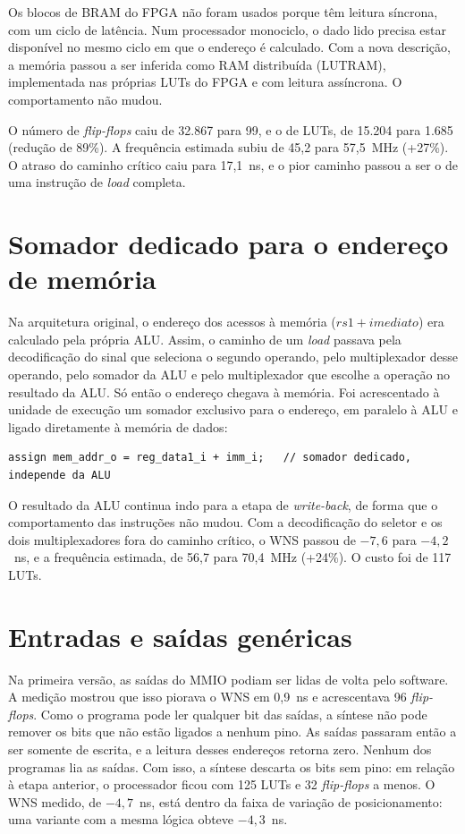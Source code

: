 Os blocos de BRAM do FPGA não foram usados porque têm leitura síncrona, com
um ciclo de latência. Num processador monociclo, o dado lido precisa estar
disponível no mesmo ciclo em que o endereço é calculado. Com a nova
descrição, a memória passou a ser inferida como RAM distribuída (LUTRAM),
implementada nas próprias LUTs do FPGA e com leitura assíncrona. O
comportamento não mudou.

O número de \textit{flip-flops} caiu de 32.867 para 99, e o de LUTs, de
15.204 para 1.685 (redução de 89\%). A frequência estimada subiu de 45,2
para 57,5~MHz (+27\%). O atraso do caminho crítico caiu para 17,1~ns, e o
pior caminho passou a ser o de uma instrução de \textit{load} completa.

\section{Somador dedicado para o endereço de memória}

Na arquitetura original, o endereço dos acessos à memória
($\mathit{rs1} + \mathit{imediato}$) era calculado pela própria ALU.
Assim, o caminho de um \textit{load} passava pela decodificação do sinal que
seleciona o segundo operando, pelo multiplexador desse operando, pelo
somador da ALU e pelo multiplexador que escolhe a operação no resultado da
ALU. Só então o endereço chegava à memória. Foi acrescentado à unidade de
execução um somador exclusivo para o endereço, em paralelo à ALU e ligado
diretamente à memória de dados:

\begin{lstlisting}
assign mem_addr_o = reg_data1_i + imm_i;   // somador dedicado, independe da ALU
\end{lstlisting}

O resultado da ALU continua indo para a etapa de \textit{write-back}, de
forma que o comportamento das instruções não mudou. Com a decodificação do
seletor e os dois multiplexadores fora do caminho crítico, o WNS passou de
$-7{,}6$ para $-4{,}2$~ns, e a frequência estimada, de 56,7 para 70,4~MHz
(+24\%). O custo foi de 117 LUTs.

\section{Entradas e saídas genéricas}

Na primeira versão, as saídas do MMIO podiam ser lidas de volta pelo software. A
medição mostrou que isso piorava o WNS em 0,9~ns e acrescentava 96
\textit{flip-flops}. Como o programa pode ler qualquer bit das saídas, a
síntese não pode remover os bits que não estão ligados a nenhum pino. As
saídas passaram então a ser somente de escrita, e a leitura desses
endereços retorna zero. Nenhum dos programas lia as saídas. Com isso, a
síntese descarta os bits sem pino: em relação à etapa anterior, o
processador ficou com 125 LUTs e 32 \textit{flip-flops} a menos. O WNS
medido, de $-4{,}7$~ns, está dentro da faixa de variação de posicionamento:
uma variante com a mesma lógica obteve $-4{,}3$~ns.

